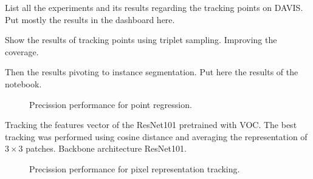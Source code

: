 List all the experiments and its results regarding the tracking points on DAVIS\@.
Put mostly the results in the dashboard here.

Show the results of tracking points using triplet sampling. Improving the coverage.

Then the results pivoting to instance segmentation. Put here the results of the notebook.


\begin{figure}[h]
	\centering
	
  \label{fig:tracking_point_regression}
	\caption{Precission performance for point regression.}
\end{figure}


Tracking the features vector of the ResNet101 pretrained with VOC\@.
The best tracking was performed using cosine distance and averaging the representation of $3 \times 3$ patches.
Backbone architecture ResNet101.

\begin{figure}[h]
  \centering
  
  \label{fig:tracking_metric_learning}
  \caption{Precission performance for pixel representation tracking.}
\end{figure}
